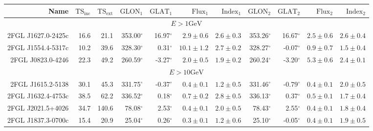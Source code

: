 \documentclass[12pt,preprint]{aastex}
\newcommand{\gev}{\text{GeV}\xspace}
\newcommand{\tsext}{{\ensuremath{\text{TS}_\text{ext}}}\xspace}
\newcommand{\tsinc}{\ensuremath{\text{TS}_\text{inc}}\xspace}
\newcommand{\glon}{\text{GLON}\xspace}
\newcommand{\glat}{\text{GLAT}\xspace}
\renewcommand{\deg}{\ensuremath{^\circ}\xspace}
\begin{document}
\clearpage
\begin{table}
    \begin{centering}
      \begin{tabular}{r|rr|rrrr|rrrr}
        \hline
        \hline
        Name                 &     \tsinc &     \tsext &      $\glon_1$ &      $\glat_1$ & $\text{Flux}_1$             &   $\text{Index}_1$ &      $\glon_2$ &      $\glat_2$ & $\text{Flux}_2$             &  $\text{Index}_2$ \\
        \hline
        \multicolumn{11}{c}{$E > 1\gev$} \\
        \hline
        2FGL J1627.0-2425c   &       16.6 &       21.1 &     353.00\deg &      16.97\deg & $       2.9 \pm        0.6$ & $  2.6 \pm   0.3$  &     353.26\deg &      16.67\deg & $       2.5 \pm        0.6$ & $  2.6 \pm   0.4$ \\
        2FGL J1554.4-5317c   &       10.2 &       39.6 &     328.30\deg &       0.31\deg & $      10.1 \pm        1.2$ & $  2.7 \pm   0.2$  &     328.27\deg &      -0.07\deg & $       0.9 \pm        0.7$ & $  1.5 \pm   0.4$ \\
        2FGL J0823.0-4246    &       22.3 &       49.2 &     260.59\deg &      -3.27\deg & $       2.0 \pm        0.5$ & $  1.9 \pm   0.2$  &     260.24\deg &      -3.20\deg & $       5.3 \pm        0.6$ & $  2.4 \pm   0.1$ \\
        \hline
        \multicolumn{11}{c}{$E > 10\gev$} \\
        \hline
        2FGL J1615.2-5138    &       30.1 &       45.3 &     331.75\deg &      -0.37\deg & $       0.4 \pm        0.1$ & $  1.2 \pm   0.5$  &     331.46\deg &      -0.79\deg & $       0.4 \pm        0.1$ & $  2.0 \pm   0.5$ \\
        2FGL J1632.4-4753c   &       38.5 &       62.2 &     336.52\deg &       0.18\deg & $       0.7 \pm        0.2$ & $  2.8 \pm   0.5$  &     336.13\deg &       0.37\deg & $       0.5 \pm        0.1$ & $  1.7 \pm   0.4$ \\
        2FGL J2021.5+4026    &       34.7 &      140.6 &      78.08\deg &       2.53\deg & $       0.4 \pm        0.1$ & $  2.0 \pm   0.5$  &      78.43\deg &       2.55\deg & $       0.4 \pm        0.1$ & $  1.8 \pm   0.4$ \\
        2FGL J1837.3-0700c   &       15.4 &       20.9 &      25.04\deg &       0.26\deg & $       0.3 \pm        0.1$ & $  1.2 \pm   0.6$  &      25.10\deg &      -0.05\deg & $       0.4 \pm        0.1$ & $  1.9 \pm   0.5$ \\

\end{tabular}
\end{centering}
\end{table}
\end{document}
